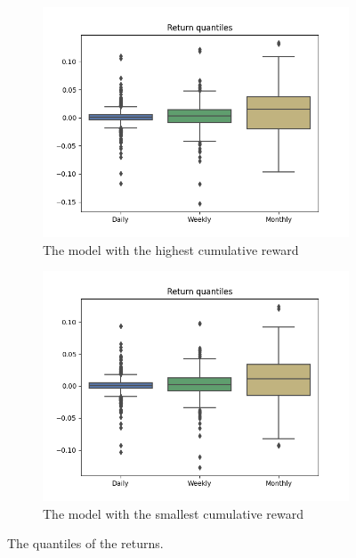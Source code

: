\documentclass[../xlapes02]{subfiles}
\begin{document}
    \begin{figure}[h!]
        \centering
        \begin{subfigure}[b]{\experimentimgwidth\textwidth}
            \centering
            \includegraphics[width=\linewidth]{image/figure/return_quantiles_max}
            \caption{The model with the highest cumulative reward}
        \end{subfigure}
        \hfill
        \begin{subfigure}{\experimentimgwidth\textwidth}
            \centering
            \includegraphics[width=\linewidth]{image/figure/return_quantiles_min}
            \caption{The model with the smallest cumulative reward}
        \end{subfigure}
        \caption{The quantiles of the returns.}
        \label{fig:Return quantiles}
    \end{figure}
\end{document}
